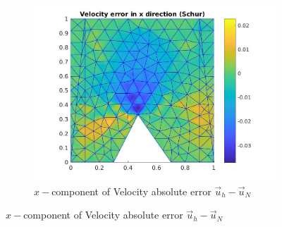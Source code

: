 \documentclass[graybox]{svmult}
\begin{document}
\begin{figure}
\begin{subfigure}{0.31\textwidth}
\includegraphics[width=\linewidth]{velocity_error_1_at_47_33.jpg}
\caption{$x-$component of Velocity absolute error $\overrightarrow{u}_h-\overrightarrow{u}_N$} \label{error_x_vel}
\end{subfigure}


\end{figure}
\end{document}
